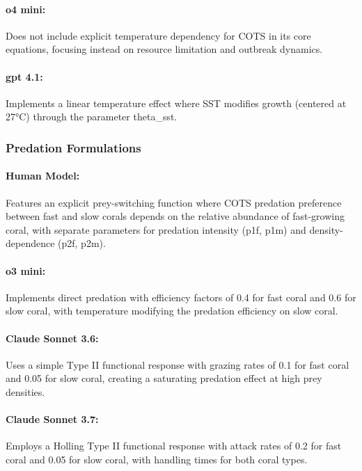 \paragraph{o4 mini:} Does not include explicit temperature dependency for COTS in its core equations, focusing instead on resource limitation and outbreak dynamics.

\paragraph{gpt 4.1:} Implements a linear temperature effect where SST modifies growth (centered at 27°C) through the parameter theta\_sst.

\subsubsection{Predation Formulations}
\label{subsubsec:predation_formulations}

\paragraph{Human Model:} Features an explicit prey-switching function where COTS predation preference between fast and slow corals depends on the relative abundance of fast-growing coral, with separate parameters for predation intensity (p1f, p1m) and density-dependence (p2f, p2m).

\paragraph{o3 mini:} Implements direct predation with efficiency factors of 0.4 for fast coral and 0.6 for slow coral, with temperature modifying the predation efficiency on slow coral.

\paragraph{Claude Sonnet 3.6:} Uses a simple Type II functional response with grazing rates of 0.1 for fast coral and 0.05 for slow coral, creating a saturating predation effect at high prey densities.

\paragraph{Claude Sonnet 3.7:} Employs a Holling Type II functional response with attack rates of 0.2 for fast coral and 0.05 for slow coral, with handling times for both coral types.

